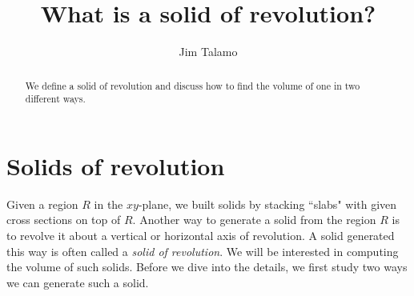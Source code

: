 \documentclass{ximera}
\author{Jim Talamo}
\title[Dig-In:]{What is a solid of revolution?}
\begin{document}
\begin{abstract}
  We define a solid of revolution and discuss how to find the volume of one in two different ways.
\end{abstract}
\maketitle


\section{Solids of revolution}

Given a region $R$ in the $xy$-plane, we built solids by stacking ``slabs" with given cross sections on top of $R$.  Another way to generate a solid from the region $R$ is to revolve it about a vertical or horizontal axis of revolution.  A solid generated this way is often called a \emph{solid of revolution}.  We will be interested in computing the volume of such solids.  Before we dive into the details, we first study two ways we can generate such a solid. 
\end{document}
